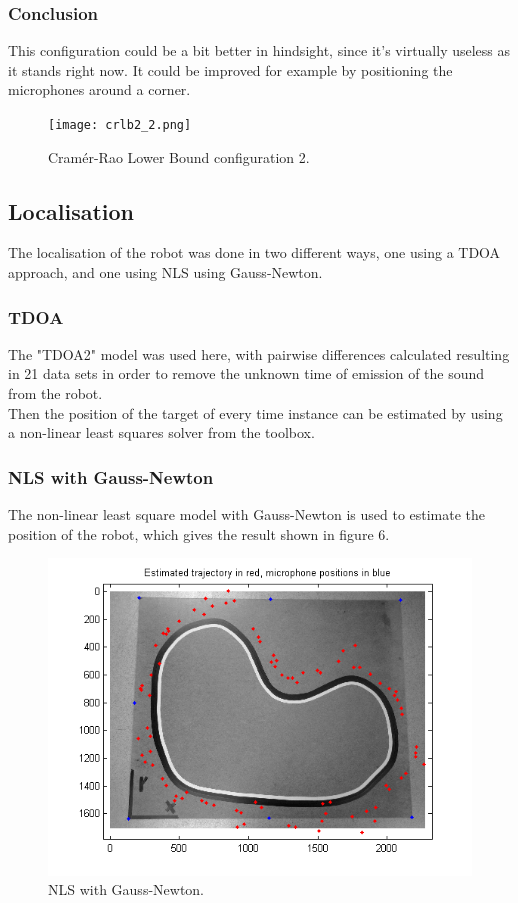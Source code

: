 \documentclass[11pt]{article}
\begin{document}
\subsubsection{Conclusion}
This configuration could be a bit better in hindsight, since it's virtually useless as it stands right now. It could be improved  for example by positioning the microphones around a corner.
\begin{figure}
\begin{center}
  \texttt{[image: crlb2\_2.png]}
  \caption{Cramér-Rao Lower Bound configuration 2.}
  \end{center}
\end{figure}


\subsection{Localisation}
The localisation of the robot was done in two different ways, one using a TDOA approach, and one using NLS using Gauss-Newton.

\subsubsection{TDOA}
The "TDOA2" model was used here, with pairwise differences calculated resulting in 21 data sets in order to remove the unknown time of emission of the sound from the robot.\\
Then the position of the target of every time instance can be estimated by using a non-linear least squares solver from the toolbox.


\subsubsection{NLS with Gauss-Newton}
The non-linear least square model with Gauss-Newton is used to estimate the position of the robot, which gives the result shown in figure 6.
\begin{figure}
\begin{center}
  \includegraphics[width=\textwidth]{NLS_Gauss_all_around.png}
  \caption{NLS with Gauss-Newton.}
  \end{center}
\end{figure}
\end{document}
